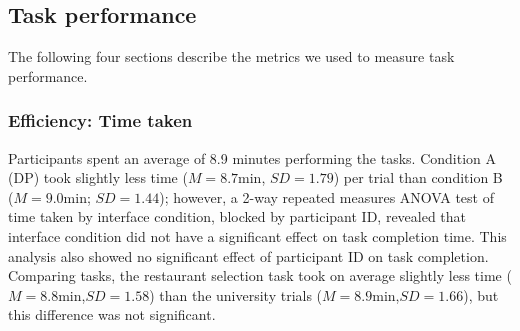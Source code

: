 \documentclass{sigchi}
\begin{document}

\subsection{Task performance}

The following four sections describe the metrics we used to measure task performance.

\subsubsection{Efficiency: Time taken}
Participants spent an average of 8.9 minutes performing the tasks. Condition A (DP) took slightly less time ($M=8.7$min, $SD=1.79$) per trial than condition B ($M=9.0$min; $SD=1.44$); however, a 2-way repeated measures ANOVA test of time taken by interface condition, blocked by participant ID, revealed that interface condition did not have a significant effect on task completion time.  This analysis also showed no significant effect of participant ID on task completion.  Comparing tasks, the restaurant selection task took on average slightly less time ($M=8.8$min,$SD=1.58$) than the university trials ($M=8.9$min,$SD=1.66$), but this difference was not significant. 
\end{document}
